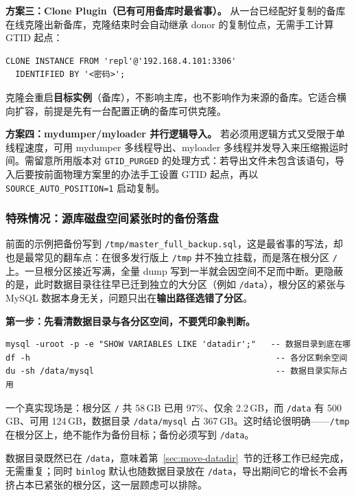 \documentclass[12pt,UTF8]{ctexbook}
\begin{document}
\textbf{方案三：Clone Plugin（已有可用备库时最省事）。} 从一台已经配好复制的备库在线克隆出新备库，克隆结束时会自动继承 donor 的复制位点，无需手工计算 GTID 起点：

\begin{lstlisting}
CLONE INSTANCE FROM 'repl'@'192.168.4.101:3306'
  IDENTIFIED BY '<密码>';
\end{lstlisting}

克隆会重启\textbf{目标实例}（备库），不影响主库，也不影响作为来源的备库。它适合横向扩容，前提是先有一台配置正确的备库可供克隆。

\textbf{方案四：mydumper/myloader 并行逻辑导入。} 若必须用逻辑方式又受限于单线程速度，可用 mydumper 多线程导出、myloader 多线程并发导入来压缩搬运时间。需留意所用版本对 \texttt{GTID\_PURGED} 的处理方式：若导出文件未包含该语句，导入后要按前面物理方案里的办法手工设置 GTID 起点，再以 \texttt{SOURCE\_AUTO\_POSITION=1} 启动复制。

\subsubsection{特殊情况：源库磁盘空间紧张时的备份落盘}

前面的示例把备份写到 \texttt{/tmp/master\_full\_backup.sql}，这是最省事的写法，却也是最常见的翻车点：在很多发行版上 \texttt{/tmp} 并不独立挂载，而是落在根分区 \texttt{/} 上。一旦根分区接近写满，全量 dump 写到一半就会因空间不足而中断。更隐蔽的是，此时数据目录往往早已迁到独立的大分区（例如 \texttt{/data}），根分区的紧张与 MySQL 数据本身无关，问题只出在\textbf{输出路径选错了分区}。

\textbf{第一步：先看清数据目录与各分区空间，不要凭印象判断。}

\begin{lstlisting}
mysql -uroot -p -e "SHOW VARIABLES LIKE 'datadir';"   -- 数据目录到底在哪
df -h                                                  -- 各分区剩余空间
du -sh /data/mysql                                     -- 数据目录实际占用
\end{lstlisting}

一个真实现场是：根分区 \texttt{/} 共 58\,GB 已用 97\%、仅余 2.2\,GB，而 \texttt{/data} 有 500\,GB、可用 124\,GB，数据目录 \texttt{/data/mysql} 占 367\,GB。这时结论很明确——\texttt{/tmp} 在根分区上，绝不能作为备份目标；备份必须写到 \texttt{/data}。

数据目录既然已在 \texttt{/data}，意味着第~\ref{sec:move-datadir}~节的迁移工作已经完成，无需重复；同时 \texttt{binlog} 默认也随数据目录放在 \texttt{/data}，导出期间它的增长不会再挤占本已紧张的根分区，这一层顾虑可以排除。
\end{document}
